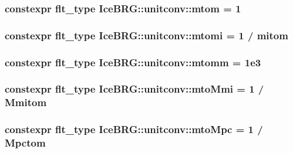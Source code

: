 \subsubsection[{mtom}]{\setlength{\rightskip}{0pt plus 5cm}constexpr {\bf flt\+\_\+type} Ice\+B\+R\+G\+::unitconv\+::mtom = 1}\label{namespaceIceBRG_1_1unitconv_a74daefd07edcb727cfb81bcbee32fda6}
\hypertarget{namespaceIceBRG_1_1unitconv_ad738d2a9e3af7c0fc41c63ca99f90f12}{}
\subsubsection[{mtomi}]{\setlength{\rightskip}{0pt plus 5cm}constexpr {\bf flt\+\_\+type} Ice\+B\+R\+G\+::unitconv\+::mtomi = 1 / {\bf mitom}}\label{namespaceIceBRG_1_1unitconv_ad738d2a9e3af7c0fc41c63ca99f90f12}
\hypertarget{namespaceIceBRG_1_1unitconv_a97ff30f991dfcc4d3efb37b56f8d413d}{}
\subsubsection[{mtomm}]{\setlength{\rightskip}{0pt plus 5cm}constexpr {\bf flt\+\_\+type} Ice\+B\+R\+G\+::unitconv\+::mtomm = 1e3}\label{namespaceIceBRG_1_1unitconv_a97ff30f991dfcc4d3efb37b56f8d413d}
\hypertarget{namespaceIceBRG_1_1unitconv_a2fbf6570a87779a65260ad3027c00478}{}
\subsubsection[{mto\+Mmi}]{\setlength{\rightskip}{0pt plus 5cm}constexpr {\bf flt\+\_\+type} Ice\+B\+R\+G\+::unitconv\+::mto\+Mmi = 1 / {\bf Mmitom}}\label{namespaceIceBRG_1_1unitconv_a2fbf6570a87779a65260ad3027c00478}
\hypertarget{namespaceIceBRG_1_1unitconv_a9f47a1741cda9dd0d041f9dc093f475e}{}
\subsubsection[{mto\+Mpc}]{\setlength{\rightskip}{0pt plus 5cm}constexpr {\bf flt\+\_\+type} Ice\+B\+R\+G\+::unitconv\+::mto\+Mpc = 1 / {\bf Mpctom}}\label{namespaceIceBRG_1_1unitconv_a9f47a1741cda9dd0d041f9dc093f475e}
\hypertarget{namespaceIceBRG_1_1unitconv_a7f73f7a919a494076732759964c87efc}{}
